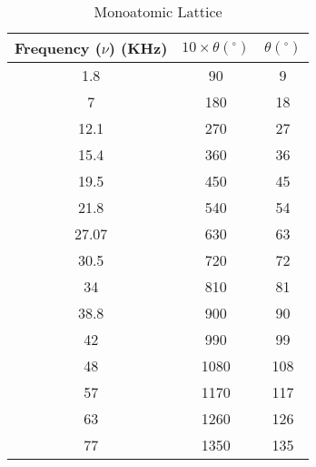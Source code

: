 \begin{table}[h]
	\centering
	\begin{tabular}{|c|c|c|}
	\hline
	\textbf{Frequency ($\nu$) (KHz)} & \textbf{$10\times\theta (^\circ)$} & \textbf{$\theta (^\circ)$} \\ \hline
	1.8 & 90 & 9 \\ \hline
	7 & 180 & 18 \\ \hline
	12.1 & 270 & 27 \\ \hline
	15.4 & 360 & 36 \\ \hline
	19.5 & 450 & 45 \\ \hline
	21.8 & 540 & 54 \\ \hline
	27.07 & 630 & 63 \\ \hline
	30.5 & 720 & 72 \\ \hline
	34 & 810 & 81 \\ \hline
	38.8 & 900 & 90 \\ \hline
	42 & 990 & 99 \\ \hline
	48 & 1080 & 108 \\ \hline
	57 & 1170 & 117 \\ \hline
	63 & 1260 & 126 \\ \hline
	77 & 1350 & 135 \\ \hline
	\end{tabular}%
	\caption{Monoatomic Lattice}
	\label{tab:mono}
\end{table}